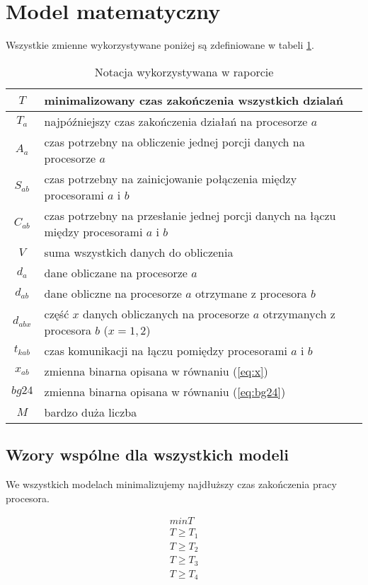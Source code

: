 
\section{Model matematyczny}

Wszystkie zmienne wykorzystywane poniżej są zdefiniowane w tabeli \ref{tab:notacja}.

\begin{table}[H]
\centering
\begin{tabular}{|c|l|}
\hline
$T$ & minimalizowany czas zakończenia wszystkich dzialań \\ \hline
$T_{a}$ & najpóźniejszy czas zakończenia działań na procesorze $a$ \\ \hline
$A_{a}$ & czas potrzebny na obliczenie jednej porcji danych na procesorze $a$ \\ \hline
$S_{ab}$ & czas potrzebny na zainicjowanie połączenia między procesorami $a$ i $b$ \\ \hline
$C_{ab}$ & czas potrzebny na przesłanie jednej porcji danych na łączu między procesorami $a$ i $b$ \\ \hline
$V$ & suma wszystkich danych do obliczenia \\ \hline
$d_{a}$ & dane obliczane na procesorze $a$ \\ \hline
$d_{ab}$ & dane obliczne na procesorze $a$ otrzymane z procesora $b$ \\ \hline
$d_{abx}$ & część $x$ danych obliczanych na procesorze $a$ otrzymanych z procesora $b$ ($x = 1, 2$) \\ \hline
$t_{kab}$ & czas komunikacji na łączu pomiędzy procesorami $a$ i $b$ \\ \hline
$x_{ab}$ & zmienna binarna opisana w równaniu (\ref{eq:x}) \\ \hline
$bg24$ & zmienna binarna opisana w równaniu (\ref{eq:bg24}) \\ \hline
$M$ & bardzo duża liczba \\ \hline
\end{tabular}
\caption{Notacja wykorzystywana w raporcie}
\label{tab:notacja}
\end{table}

\subsection{Wzory wspólne dla wszystkich modeli}

We wszystkich modelach minimalizujemy najdłuższy czas zakończenia pracy procesora.

\begin{equation} \label{eq:min}
\begin{array}{l}
min T \\
T \geq T_{1} \\
T \geq T_{2} \\
T \geq T_{3} \\
T \geq T_{4}
\end{array}
\end{equation}

